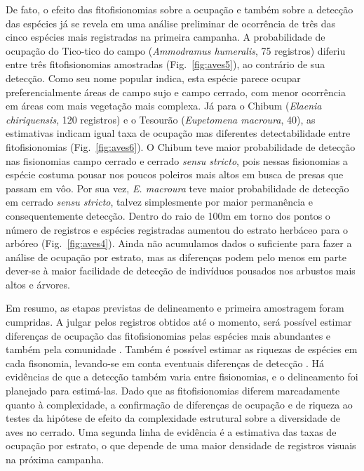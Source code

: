 De fato, o efeito das fitofisionomias sobre a ocupação e também sobre
a detecção das espécies já se revela em uma análise preliminar
de ocorrência de três das cinco espécies mais registradas na
primeira campanha. A probabilidade de ocupação do  Tico-tico 
do campo  (\textit{Ammodramus humeralis}, 75 registros) 
diferiu entre três fitofisionomias amostradas
(Fig.~\ref{fig:aves5}), ao contrário de sua detecção. 
Como seu nome popular indica, esta espécie parece ocupar
preferencialmente áreas de campo sujo e campo cerrado, com menor
ocorrência em áreas com mais vegetação mais complexa. Já para o Chibum
(\textit{Elaenia chiriquensis}, 120 registros) e o Tesourão (\textit{Eupetomena
macroura}, 40), as estimativas indicam igual taxa de ocupação mas diferentes 
detectabilidade entre fitofisionomias 
(Fig.~\ref{fig:aves6}). O Chibum teve maior
probabilidade de detecção nas fisionomias campo cerrado e cerrado
\textit{sensu stricto}, pois nessas fisionomias a espécie costuma pousar nos poucos 
poleiros mais altos em busca de presas que passam em vôo. Por sua vez,
\textit{E. macroura} teve maior probabilidade de detecção em cerrado
\textit{sensu stricto}, talvez simplesmente por
maior permanência e consequentemente detecção.
Dentro do raio de 100m em torno dos pontos o número de registros e 
espécies registradas  aumentou
do estrato herbáceo para o arbóreo (Fig.~\ref{fig:aves4}).  
Ainda não acumulamos 
dados o suficiente para fazer a análise de ocupação
por estrato, mas as diferenças podem pelo menos em parte dever-se 
à maior facilidade de detecção de indivíduos pousados
nos arbustos mais altos e árvores. 

Em resumo, as etapas previstas de delineamento e primeira amostragem
foram cumpridas. A julgar pelos registros obtidos até o momento,
será possível estimar diferenças de ocupação das fitofisionomias
pelas espécies mais abundantes e também pela comunidade \cite{dorazio2005}.
Também é possível estimar as riquezas de espécies
em cada fisonomia, levando-se em conta eventuais diferenças de detecção \cite{dorazio2006}.
Há evidências de que a detecção também varia entre fisionomias,
e o delineamento foi planejado para estimá-las.
Dado que as fitofisionomias diferem marcadamente quanto à complexidade,
a confirmação de diferenças de ocupação e de riqueza ao testes
da hipótese de efeito da complexidade estrutural sobre a diversidade
de aves no cerrado. Uma segunda linha de evidência é a estimativa das
taxas de ocupação por estrato, o que depende de uma maior densidade de 
registros visuais na próxima campanha.

